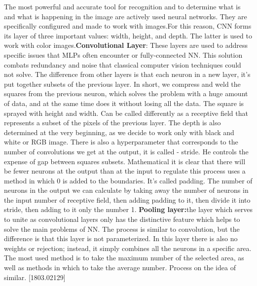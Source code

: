 \par The most powerful and accurate tool for recognition and to determine what is and what is happening in the image are actively used neural networks. They are specifically configured and made to work with images.For this reason, CNN forms its layer of three important values: width, height, and depth. The latter is used to work with color images.\textbf{Convolutional Layer}: These layers are used to address specific issues that MLPs often encounter or fully-connected NN. This solution combats redundancy and noise that classical computer vision techniques could not solve. The difference from other layers is that each neuron in a new layer, it's put together subsets of the previous layer. In short, we compress and weld the squares from the previous neuron, which solves the problem with a huge amount of data, and at the same time does it without losing all the data. The square is sprayed with height and width. Can be called differently as a receptive field that represents a subset of the pixels of the previous layer. The depth is also determined at the very beginning, as we decide to work only with black and white or RGB image. There is also a hyperparameter that corresponds to the number of convolutions we get at the output, it is called - stride. He controls the expense of gap between squares subsets. Mathematical it is clear that there will be fewer neurons at the output than at the input to regulate this process uses a method in which 0 is added to the boundaries. It's called padding. The number of neurons in the output we can calculate by taking away the number of neurons in the input number of receptive field, then adding padding to it, then divide it into stride, then adding to it only the number 1. \textbf{Pooling layer:}the layer which serves to unite as convolutional layers only has the distinctive feature which helps to solve the main problems of NN. The process is similar to convolution, but the difference is that this layer is not parameterized. In this layer there is also no weights or rejection; instead, it simply combines all the neurons in a specific area. The most used method is to take the maximum number of the selected area, as well as methods in which to take the average number. Process on the idea of similar. [1803.02129] 



